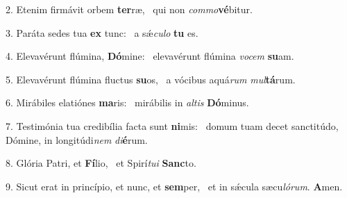 2. Etenim firmávit orbem \textbf{ter}ræ, \ast\  qui non \textit{com}\textit{mo}\textbf{vé}bitur.\

3. Paráta sedes tua \textbf{ex} tunc: \ast\  a sǽ\textit{cu}\textit{lo} \textbf{tu} es.\

4. Elevavérunt flúmina, \textbf{Dó}mine: \ast\  elevavérunt flúmina \textit{vo}\textit{cem} \textbf{su}am.\

5. Elevavérunt flúmina fluctus \textbf{su}os, \ast\  a vócibus aquá\textit{rum} \textit{mul}\textbf{tá}rum.\

6. Mirábiles elatiónes \textbf{ma}ris: \ast\  mirábilis in \textit{al}\textit{tis} \textbf{Dó}minus.\

7. Testimónia tua credibília facta sunt \textbf{ni}mis: \ast\  domum tuam decet sanctitúdo, Dómine, in longitúdi\textit{nem} \textit{di}\textbf{é}rum.\

8. Glória Patri, et \textbf{Fí}lio, \ast\  et Spirí\textit{tu}\textit{i} \textbf{Sanc}to.\

9. Sicut erat in princípio, et nunc, et \textbf{sem}per, \ast\  et in sǽcula sæcu\textit{ló}\textit{rum}. \textbf{A}men.\

